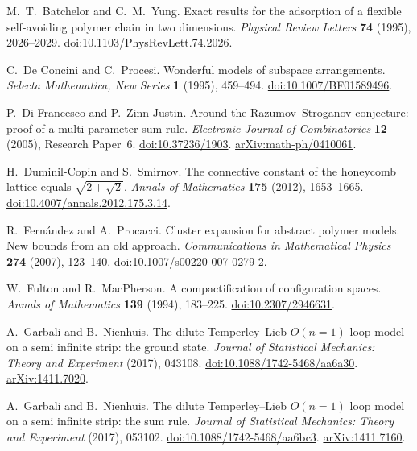 M.~T.~Batchelor and C.~M.~Yung.
Exact results for the adsorption of a flexible self-avoiding polymer chain
in two dimensions.
\emph{Physical Review Letters} \textbf{74} (1995), 2026--2029.
\href{https://doi.org/10.1103/PhysRevLett.74.2026}
{doi:10.1103/PhysRevLett.74.2026}.

C.~De Concini and C.~Procesi.
Wonderful models of subspace arrangements.
\emph{Selecta Mathematica, New Series} \textbf{1} (1995), 459--494.
\href{https://doi.org/10.1007/BF01589496}{doi:10.1007/BF01589496}.

P.~Di Francesco and P.~Zinn-Justin.
Around the Razumov--Stroganov conjecture: proof of a multi-parameter sum rule.
\emph{Electronic Journal of Combinatorics} \textbf{12} (2005), Research Paper~6.
\href{https://doi.org/10.37236/1903}{doi:10.37236/1903}.
\href{https://arxiv.org/abs/math-ph/0410061}{arXiv:math-ph/0410061}.

H.~Duminil-Copin and S.~Smirnov.
The connective constant of the honeycomb lattice equals $\sqrt{2+\sqrt2}$.
\emph{Annals of Mathematics} \textbf{175} (2012), 1653--1665.
\href{https://doi.org/10.4007/annals.2012.175.3.14}{doi:10.4007/annals.2012.175.3.14}.

R.~Fern\'andez and A.~Procacci.
Cluster expansion for abstract polymer models. New bounds from an old approach.
\emph{Communications in Mathematical Physics} \textbf{274} (2007), 123--140.
\href{https://doi.org/10.1007/s00220-007-0279-2}{doi:10.1007/s00220-007-0279-2}.

W.~Fulton and R.~MacPherson.
A compactification of configuration spaces.
\emph{Annals of Mathematics} \textbf{139} (1994), 183--225.
\href{https://doi.org/10.2307/2946631}{doi:10.2307/2946631}.

A.~Garbali and B.~Nienhuis.
The dilute Temperley--Lieb $O(n=1)$ loop model on a semi infinite strip:
the ground state.
\emph{Journal of Statistical Mechanics: Theory and Experiment} (2017), 043108.
\href{https://doi.org/10.1088/1742-5468/aa6a30}{doi:10.1088/1742-5468/aa6a30}.
\href{https://arxiv.org/abs/1411.7020}{arXiv:1411.7020}.

A.~Garbali and B.~Nienhuis.
The dilute Temperley--Lieb $O(n=1)$ loop model on a semi infinite strip:
the sum rule.
\emph{Journal of Statistical Mechanics: Theory and Experiment} (2017), 053102.
\href{https://doi.org/10.1088/1742-5468/aa6bc3}{doi:10.1088/1742-5468/aa6bc3}.
\href{https://arxiv.org/abs/1411.7160}{arXiv:1411.7160}.

